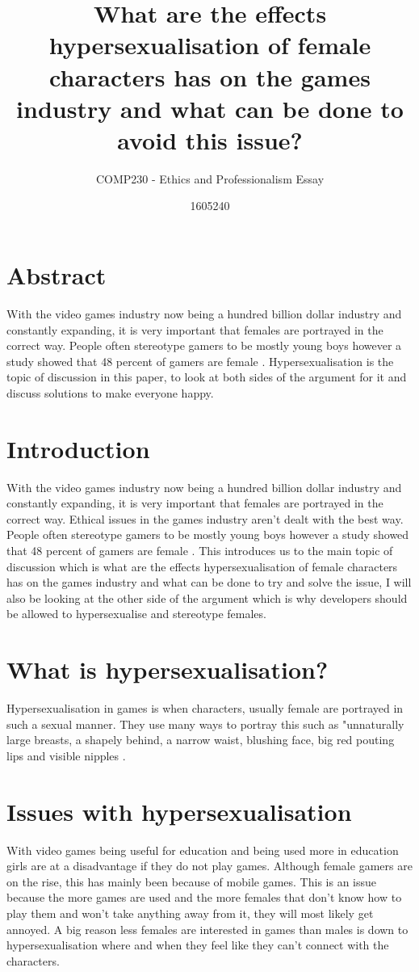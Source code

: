 \documentclass{scrartcl}
\title{What are the effects hypersexualisation of female characters has on the games industry and what can be done to avoid this issue?}
\subtitle{COMP230 - Ethics and Professionalism Essay}
\author{1605240}
\begin{document}
\maketitle

\section{Abstract}
With the video games industry now being a hundred billion dollar industry \cite{bowey2017don} and constantly expanding, it is very important that females are portrayed in the correct way. People often stereotype gamers to be mostly young boys however a study showed that 48 percent of gamers are female \cite{heron2014sexism}. Hypersexualisation is the topic of discussion in this paper, to look at both sides of the argument for it and discuss solutions to make everyone happy.
\newpage

\section{Introduction}
With the video games industry now being a hundred billion dollar industry \cite{bowey2017don} and constantly expanding, it is very important that females are portrayed in the correct way. Ethical issues in the games industry aren't dealt with the best way\cite{flick2016ask}. People often stereotype gamers to be mostly young boys however a study showed that 48 percent of gamers are female \cite{heron2014sexism}. This introduces us to the main topic of discussion which is what are the effects hypersexualisation of female characters has on the games industry and what can be done to try and solve the issue, I will also be looking at the other side of the argument which is why developers should be allowed to hypersexualise and stereotype  females.

\section{What is hypersexualisation?}
Hypersexualisation in games is when characters, usually female are portrayed in such a sexual manner. They use many ways to portray this such as "unnaturally large breasts, a shapely behind, a narrow waist, blushing face, big red pouting lips and visible nipples \cite{waern2005hypersexual}.

\section{Issues with hypersexualisation}
With video games being useful for education\cite{lekka2014computer} and being used more in education\cite{jenson2007girls} girls are at a disadvantage if they do not play games\cite{jenson2007girls}. Although female gamers are on the rise, this has mainly been because of mobile games\cite{bbc}. This is an issue because the more games are used and the more females that don't know how to play them and won't take anything away from it, they will most likely get annoyed. A big reason less females are interested in games than males is down to hypersexualisation where and when they feel like they can't connect with the characters.\cite{desai2016effects} \newline
\end{document}
